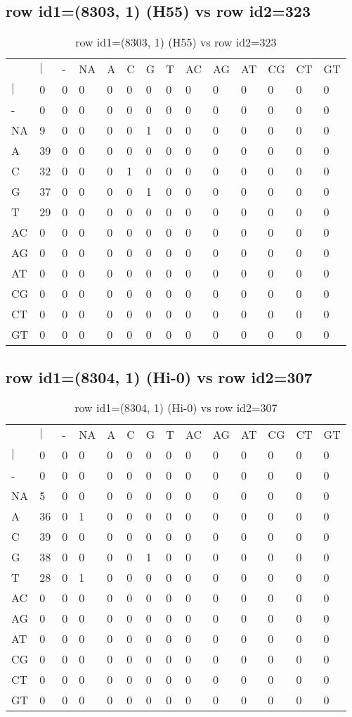 \subsection{row id1=(8303, 1) (H55) vs row id2=323}
\begin{center}
\begin{longtable}{|l|l|l|l|l|l|l|l|l|l|l|l|l|l|}
\caption{row id1=(8303, 1) (H55) vs row id2=323} \label{table_dm284}\\
\hline
\\
\hline
&$|$&-&NA&A&C&G&T&AC&AG&AT&CG&CT&GT\\
$|$&0&0&0&0&0&0&0&0&0&0&0&0&0\\
-&0&0&0&0&0&0&0&0&0&0&0&0&0\\
NA&9&0&0&0&0&1&0&0&0&0&0&0&0\\
A&39&0&0&0&0&0&0&0&0&0&0&0&0\\
C&32&0&0&0&1&0&0&0&0&0&0&0&0\\
G&37&0&0&0&0&1&0&0&0&0&0&0&0\\
T&29&0&0&0&0&0&0&0&0&0&0&0&0\\
AC&0&0&0&0&0&0&0&0&0&0&0&0&0\\
AG&0&0&0&0&0&0&0&0&0&0&0&0&0\\
AT&0&0&0&0&0&0&0&0&0&0&0&0&0\\
CG&0&0&0&0&0&0&0&0&0&0&0&0&0\\
CT&0&0&0&0&0&0&0&0&0&0&0&0&0\\
GT&0&0&0&0&0&0&0&0&0&0&0&0&0\\
\hline
\end{longtable}
\end{center}

\subsection{row id1=(8304, 1) (Hi-0) vs row id2=307}
\begin{center}
\begin{longtable}{|l|l|l|l|l|l|l|l|l|l|l|l|l|l|}
\caption{row id1=(8304, 1) (Hi-0) vs row id2=307} \label{table_dm286}\\
\hline
\\
\hline
&$|$&-&NA&A&C&G&T&AC&AG&AT&CG&CT&GT\\
$|$&0&0&0&0&0&0&0&0&0&0&0&0&0\\
-&0&0&0&0&0&0&0&0&0&0&0&0&0\\
NA&5&0&0&0&0&0&0&0&0&0&0&0&0\\
A&36&0&1&0&0&0&0&0&0&0&0&0&0\\
C&39&0&0&0&0&0&0&0&0&0&0&0&0\\
G&38&0&0&0&0&1&0&0&0&0&0&0&0\\
T&28&0&1&0&0&0&0&0&0&0&0&0&0\\
AC&0&0&0&0&0&0&0&0&0&0&0&0&0\\
AG&0&0&0&0&0&0&0&0&0&0&0&0&0\\
AT&0&0&0&0&0&0&0&0&0&0&0&0&0\\
CG&0&0&0&0&0&0&0&0&0&0&0&0&0\\
CT&0&0&0&0&0&0&0&0&0&0&0&0&0\\
GT&0&0&0&0&0&0&0&0&0&0&0&0&0\\
\hline
\end{longtable}
\end{center}

